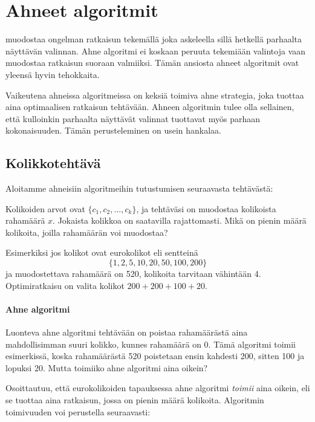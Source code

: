\chapter{Ahneet algoritmit}


muodostaa ongelman ratkaisun
tekemällä joka askeleella
sillä hetkellä parhaalta näyttävän valinnan.
Ahne algoritmi ei koskaan 
peruuta tekemiään valintoja vaan
muodostaa ratkaisun suoraan valmiiksi.
Tämän ansiosta ahneet algoritmit ovat
yleensä hyvin tehokkaita.

Vaikeutena ahneissa algoritmeissa on
keksiä toimiva ahne strategia,
joka tuottaa aina optimaalisen ratkaisun tehtävään.
Ahneen algoritmin tulee olla sellainen,
että kulloinkin parhaalta näyttävät valinnat
tuottavat myös parhaan kokonaisuuden.
Tämän perusteleminen on usein hankalaa.

\section{Kolikkotehtävä}

Aloitamme ahneisiin algoritmeihin tutustumisen
seuraavasta tehtävästä:

\begin{task}
Kolikoiden arvot ovat $\{c_1,c_2,\ldots,c_k\}$,
ja tehtäväsi on muodostaa kolikoista rahamäärä $x$.
Jokaista kolikkoa on saatavilla rajattomasti.
Mikä on pienin määrä kolikoita,
joilla rahamäärän voi muodostaa?
\end{task}

\noindent
Esimerkiksi jos kolikot ovat eurokolikot eli sentteinä
\[\{1,2,5,10,20,50,100,200\}\]
ja muodostettava rahamäärä on 520,
kolikoita tarvitaan vähintään 4.
Optimiratkaisu on valita kolikot $200+200+100+20$.

\subsubsection{Ahne algoritmi}

Luonteva ahne algoritmi tehtävään
on poistaa rahamäärästä aina mahdollisimman
suuri kolikko, kunnes rahamäärä on 0.
Tämä algoritmi toimii esimerkissä,
koska rahamäärästä 520 
poistetaan ensin kahdesti 200, sitten 100
ja lopuksi 20.
Mutta toimiiko ahne algoritmi aina oikein?

Osoittautuu, että eurokolikoiden tapauksessa
ahne algoritmi \emph{toimii} aina oikein,
eli se tuottaa aina ratkaisun,
jossa on pienin määrä kolikoita.
Algoritmin toimivuuden voi perustella
seuraavasti:

